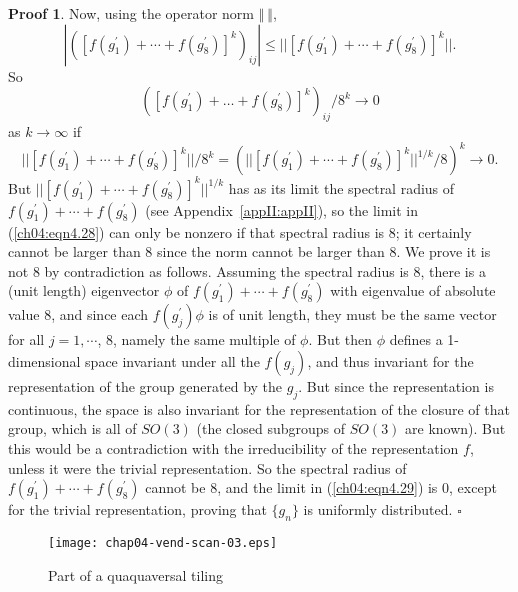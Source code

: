\documentclass[reqno]{stml-l}
\theoremstyle{plain}
\theoremstyle{definition}
\newtheorem*{proof*}{Proof}
\numberwithin{equation}{chapter}
\begin{document}
\begin{proof*}
Now, using the operator norm $\Vert\ \Vert$,
\begin{equation} \label{ch04:eqn4.27}
|([f(g_{1}^{\prime})+\cdots+f(g^{\prime}_{8})]^{k})_{ij}|\leq||[f(g_{1}^{\prime})+\cdots+f(g^{\prime}_{8})]^{k}||. \end{equation}
So
\begin{equation} \label{ch04:eqn4.28}
([f(g_{1}^{\prime})+\ldots+f(g_{8}^{\prime})]^{k})_{ij}/8^{k}\longrightarrow0
\end{equation}
as $k\rightarrow\infty$ if
\begin{equation}\label{ch04:eqn4.29}
||[f(g_{1}^{\prime})+\cdots+f(g_{8}^{\prime})]^{k}||/8^{k}=(||[f(g_{1}^{\prime})+\cdots+f(g_{8}^{\prime})]^{k}||^{1/k}/8)^{k}\longrightarrow0. \end{equation}
But $||[f(g_{1}^{\prime})+\cdots+f(g_{8}^{\prime})]^{k}||^{1/k}$ has as its limit the spectral radius of $f(g_{1}^{\prime})+\cdots+f(g_{8}^{\prime})$ (see Appendix~\ref{appII:appII}), so the limit in (\ref{ch04:eqn4.28}) can only be nonzero if that spectral radius is 8; it certainly cannot be larger than 8 since the norm cannot be larger than 8. We prove it is not 8 by contradiction as follows. Assuming the spectral radius is 8, there is a (unit length) eigenvector $\phi$ of $f(g_{1}^{\prime})+\cdots+f(g_{8}^{\prime})$ with eigenvalue of absolute value 8, and since each $f(g_{j}^{\prime})\phi$ is of unit length, they must be the same vector for all $j=1,\cdots$, 8, namely the same multiple of $\phi$. But then $\phi$ defines a 1-dimensional space invariant under all the $f(g_{j})$, and thus invariant for the representation of the group generated by the $g_{j}$. But since the representation is continuous, the space is also invariant for the representation of the closure of that group, which is all of $SO(3)$ (the closed subgroups of $SO(3)$ are known). But this would be a contradiction with the irreducibility of the representation $f$, unless it were the trivial representation. So the spectral radius of $f(g_{1}^{\prime})+\cdots+f(g_{8}^{\prime})$ cannot be 8, and the limit in (\ref{ch04:eqn4.29}) is $0$, except for the trivial representation, proving that $\{g_{n}\}$ is uniformly distributed.
\hfill$\square$
\end{proof*}

\begin{figure}[!h]
\texttt{[image: chap04-vend-scan-03.eps]}
\caption{Part of a quaquaversal tiling}\label{ch04:fig32}
\end{figure}
\end{document}
